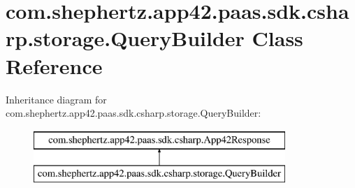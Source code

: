 \hypertarget{classcom_1_1shephertz_1_1app42_1_1paas_1_1sdk_1_1csharp_1_1storage_1_1_query_builder}{\section{com.\+shephertz.\+app42.\+paas.\+sdk.\+csharp.\+storage.\+Query\+Builder Class Reference}
\label{classcom_1_1shephertz_1_1app42_1_1paas_1_1sdk_1_1csharp_1_1storage_1_1_query_builder}
}
Inheritance diagram for com.\+shephertz.\+app42.\+paas.\+sdk.\+csharp.\+storage.\+Query\+Builder\+:\begin{figure}[H]
\begin{center}
\leavevmode
\includegraphics[height=2.000000cm]{classcom_1_1shephertz_1_1app42_1_1paas_1_1sdk_1_1csharp_1_1storage_1_1_query_builder}
\end{center}
\end{figure}
